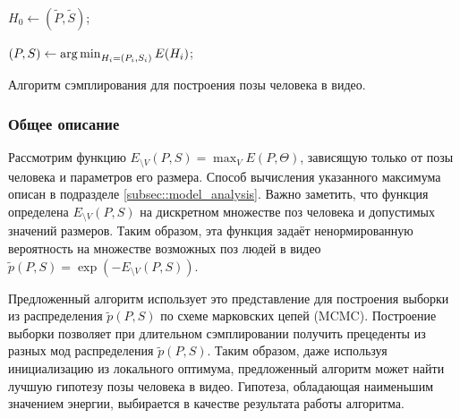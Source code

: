 \begin{algorithm}[H]
	\SetAlgoLined %
	
	
	
	$H_0 \leftarrow (\tilde{P}, \tilde{S})$;
	
	
	$(P, S) \leftarrow \operatorname*{arg\,min}_{H_i = (P_i, S_i)}{E(H_i)}$;
	
	\caption{Алгоритм сэмплирования для построения позы человека в видео.}
	\label{alg:generalHM}
\end{algorithm}


\subsubsection{Общее описание}

Рассмотрим функцию $E_{\setminus V}(P, S) = \max_V{E(P, \Theta)}$, зависящую только от позы человека и параметров его размера. Способ вычисления указанного максимума описан в подразделе \ref{subsec::model_analysis}. Важно заметить, что функция определена $E_{\setminus V}(P, S)$ на дискретном множестве поз человека и допустимых значений размеров. Таким образом, эта функция задаёт ненормированную вероятность на множестве возможных поз людей в видео $\tilde{p}(P, S) = \exp(-E_{\setminus V}(P, S))$.

Предложенный алгоритм использует это представление для построения выборки из распределения $\tilde{p}(P, S)$ по схеме марковских цепей (MCMC). Построение выборки позволяет при длительном сэмплировании получить прецеденты из разных мод распределения $\tilde{p}(P, S)$. Таким образом, даже используя инициализацию из локального оптимума, предложенный алгоритм может найти лучшую гипотезу позы человека в видео. Гипотеза, обладающая наименьшим значением энергии, выбирается в качестве результата работы алгоритма. 

